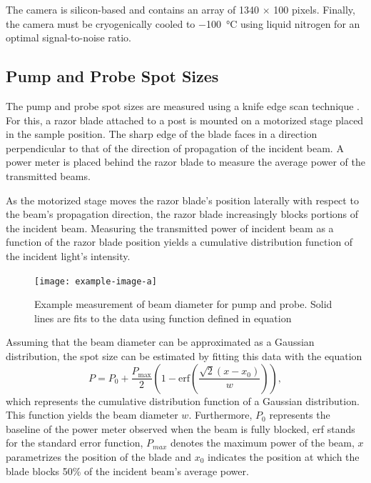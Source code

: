 The camera is silicon-based and contains an array of 1340 $\times$ 100 pixels. Finally, the camera must be cryogenically cooled to \SI{-100}{\celsius} using liquid nitrogen for an optimal signal-to-noise ratio.


\subsection{Pump and Probe Spot Sizes}
The pump and probe spot sizes are measured using a knife edge scan technique \cite{firester1977knife}. For this, a razor blade attached to a post is mounted on a motorized stage placed in the sample position. The sharp edge of the blade faces in a direction perpendicular to that of the direction of propagation of the incident beam. A power meter is placed behind the razor blade to measure the average power of the transmitted beams.

As the motorized stage moves the razor blade's position laterally with respect to the beam's propagation direction, the razor blade increasingly blocks portions of the incident beam.  Measuring the transmitted power of incident beam as a function of the razor blade position yields a cumulative distribution function of the incident light's intensity.

\begin{figure}[h]
	\centering
	\texttt{[image: example-image-a]}
	\caption{Example measurement of beam diameter for pump and probe. Solid lines are fits to the data using function defined in equation}
	\label{fig:beam_diamter_measurement}
\end{figure}

Assuming that the beam diameter can be approximated as a Gaussian distribution, the spot size can be estimated by fitting this data with the equation 
\begin{equation}
	P = P_0 + \dfrac{P_{\mathrm{max}}}{2} \left( 1 - \mathrm{erf} \left( \dfrac{\sqrt{2}(x - x_0)}{w} \right) \right),
\end{equation}
which represents the cumulative distribution function of a Gaussian distribution. This function yields the beam diameter $w$. Furthermore, $P_0$ represents the baseline of the power meter observed when the beam is fully blocked, erf stands for the standard error function, $P_{max}$ denotes the maximum power of the beam, $x$ parametrizes the position of the blade and $x_0$ indicates the position at which the blade blocks 50\% of the incident beam's average power.  







